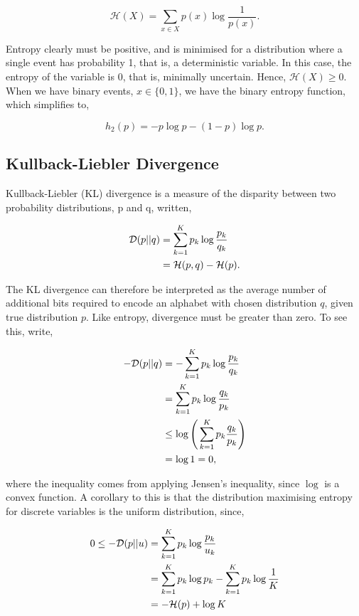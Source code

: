\documentclass[11pt]{amsart}
\begin{document}
$$\mathcal{H}(X) = \sum_{x \in X}p(x)\log\frac{1}{p(x)}.$$

Entropy clearly must be positive, and is minimised for a distribution where a single event has probability 1, that is, a deterministic variable. In this case, the entropy of the variable is 0, that is, minimally uncertain. Hence, $\mathcal{H}(X) \geq 0$. When we have binary events, $x \in \{0, 1\}$, we have the binary entropy function, which simplifies to,

$$h_2(p) = -p\log p - (1-p)\log p.$$

\subsection{Kullback-Liebler Divergence}

Kullback-Liebler (KL) divergence is a measure of the disparity between two probability distributions, p and q, written,

\begin{align}
\mathcal{D}(p || q) &= \sum_{k=1}^K p_k \log\frac{p_k}{q_k} \notag \\
&= \mathcal{H}(p, q) - \mathcal{H}(p). \notag
\end{align}

The KL divergence can therefore be interpreted as the average number of additional bits required to encode an alphabet with chosen distribution $q$, given true distribution $p$. Like entropy, divergence must be greater than zero. To see this, write,

\begin{align}
-\mathcal{D}(p || q) &= -\sum_{k=1}^K p_k \log\frac{p_k}{q_k} \notag \\
&= \sum_{k=1}^K p_k \log\frac{q_k}{p_k} \notag \\
&\leq \log\Bigg(\sum_{k=1}^K p_k\frac{q_k}{p_k}\Bigg) \notag \\
&= \log 1 = 0, \notag
\end{align}

where the inequality comes from applying Jensen's inequality, since $\log$ is a convex function. A corollary to this is that the distribution maximising entropy for discrete variables is the uniform distribution, since,

\begin{align}
0 \leq -\mathcal{D}(p || u) &= \sum_{k=1}^K p_k \log\frac{p_k}{u_k} \notag \\
&= \sum_{k=1}^K p_k \log{p_k} - \sum_{k=1}^K p_k \log \frac{1}{K} \notag \\
&= -\mathcal{H}(p) + \log K \notag
\end{align}
\end{document}
